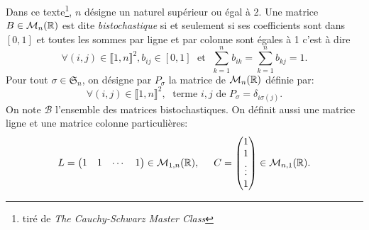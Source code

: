 \noindent
Dans ce texte\footnote{tiré de \emph{The Cauchy-Schwarz Master Class}}, $n$ désigne un naturel supérieur ou égal à 2.\newline
Une matrice $B\in \mathcal{M}_n(\mathbb{R})$ est dite \emph{bistochastique} si et seulement si ses coefficients sont dans $\left[ 0,1 \right]$ et toutes les sommes par ligne et par colonne sont égales à 1 c'est à dire
\[
 \forall (i,j)\in \llbracket 1,n \rrbracket^2, b_{i j} \in \left[ 0, 1\right]\; \text{ et } \; \sum_{k=1}^n b_{i k} = \sum_{k=1}^n b_{k j} = 1. 
\]
Pour tout $\sigma \in \mathfrak{S}_n$, on désigne par $P_\sigma$ la matrice de $\mathcal{M}_n(\mathbb{R})$ définie par:
\[
 \forall (i,j)\in \llbracket 1,n \rrbracket^2, \;\text{ terme $i,j$ de } P_\sigma = \delta_{i \sigma(j)}.
\]
On note $\mathcal{B}$ l'ensemble des matrices bistochastiques. On définit aussi une matrice ligne et une matrice colonne particulières:
\[
 L =
 \begin{pmatrix}
  1 & 1 & \cdots & 1
 \end{pmatrix} \in \mathcal{M}_{1,n}(\mathbb{R}),\hspace{0.5cm}
 C =
 \begin{pmatrix}
  1 \\ 1 \\ \vdots \\ 1
 \end{pmatrix} \in \mathcal{M}_{n,1}(\mathbb{R}).
\]

